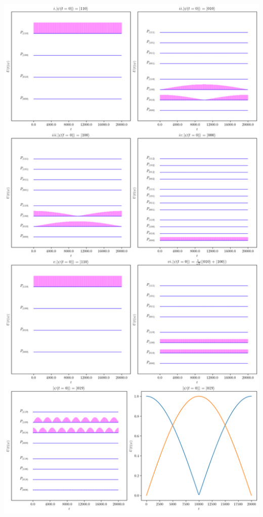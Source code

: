 \vfill
\begin{center}
    \includegraphics[width=1\linewidth]{Resources//245//Homework 7/245 Homework 7 Problem 2.png}
\end{center}
\vfill

\newpage
\pagebreak
